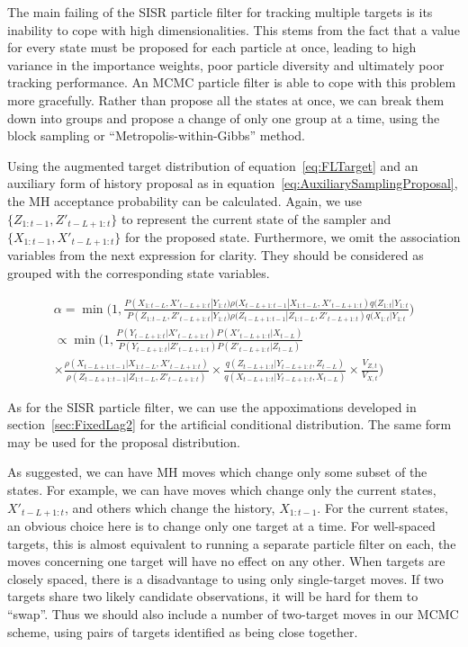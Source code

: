 The main failing of the SISR particle filter for tracking multiple targets is its inability to cope with high dimensionalities. This stems from the fact that a value for every state must be proposed for each particle at once, leading to high variance in the importance weights, poor particle diversity and ultimately poor tracking performance. An MCMC particle filter is able to cope with this problem more gracefully. Rather than propose all the states at once, we can break them down into groups and propose a change of only one group at a time, using the block sampling or ``Metropolis-within-Gibbs'' method.

Using the augmented target distribution of equation~\ref{eq:FLTarget} and an auxiliary form of history proposal as in equation~\ref{eq:AuxiliarySamplingProposal}, the MH acceptance probability can be calculated. Again, we use $\{Z_{1:t-1}, Z'_{t-L+1:t}\}$ to represent the current state of the sampler and $\{X_{1:t-1}, X'_{t-L+1:t}\}$ for the proposed state. Furthermore, we omit the association variables from the next expression for clarity. They should be considered as grouped with the corresponding state variables.

\begin{multline}
\alpha = \min \bigg ( 1,  \frac{ P(X_{1:t-L}, X'_{t-L+1:t}|Y_{1:t}) \rho(X_{t-L+1:t-1}|X_{1:t-L}, X'_{t-L+1:t}) q(Z_{1:t}|Y_{1:t} }{ P(Z_{1:t-L}, Z'_{t-L+1:t}|Y_{1:t}) \rho(Z_{t-L+1:t-1}|Z_{1:t-L}, Z'_{t-L+1:t}) q(X_{1:t}|Y_{1:t} }  \bigg ) \\
\propto \min \bigg ( 1,  \frac{ P(Y_{t-L+1:t}|X'_{t-L+1:t})P(X'_{t-L+1:t}|X_{t-L}) }{ P(Y_{t-L+1:t}|Z'_{t-L+1:t})P(Z'_{t-L+1:t}|Z_{t-L}) } \\
 \times \frac{\rho(X_{t-L+1:t-1}|X_{1:t-L}, X'_{t-L+1:t})}{\rho(Z_{t-L+1:t-1}|Z_{1:t-L}, Z'_{t-L+1:t})} \times \frac{q(Z_{t-L+1:t}|Y_{t-L+1:t}, Z_{t-L})}{q(X_{t-L+1:t}|Y_{t-L+1:t}, X_{t-L})} \times \frac{V_{Z,t}}{V_{X,t}}  \bigg )
\label{eq:FLAcceptance}
\end{multline}

As for the SISR particle filter, we can use the appoximations developed in section~\ref{sec:FixedLag2} for the artificial conditional distribution. The same form may be used for the proposal distribution.

As suggested, we can have MH moves which change only some subset of the states. For example, we can have moves which change only the current states, $X'_{t-L+1:t}$, and others which change the history, $X_{1:t-1}$. For the current states, an obvious choice here is to change only one target at a time. For well-spaced targets, this is almost equivalent to running a separate particle filter on each, the moves concerning one target will have no effect on any other. When targets are closely spaced, there is a disadvantage to using only single-target moves. If two targets share two likely candidate observations, it will be hard for them to ``swap''. Thus we should also include a number of two-target moves in our MCMC scheme, using pairs of targets identified as being close together.

